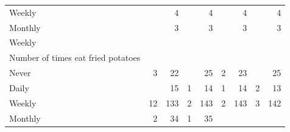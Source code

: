 \documentclass{article}
\begin{document}
\begin{table}[!h]
{\begin{tabular}{lllllllll}
			\multicolumn{1}{l}{\hspace{5em}Weekly} &
			\multicolumn{1}{|r}{} &
			\multicolumn{1}{r}{4} &
			\multicolumn{1}{r}{} &
			\multicolumn{1}{r}{4} &
			\multicolumn{1}{r}{} &
			\multicolumn{1}{r}{4} &
			\multicolumn{1}{r}{} &
			\multicolumn{1}{r}{4} \\
			\multicolumn{1}{l}{\hspace{5em}Monthly} &
			\multicolumn{1}{|r}{} &
			\multicolumn{1}{r}{3} &
			\multicolumn{1}{r}{} &
			\multicolumn{1}{r}{3} &
			\multicolumn{1}{r}{} &
			\multicolumn{1}{r}{3} &
			\multicolumn{1}{r}{} &
			\multicolumn{1}{r}{3} \\
			\multicolumn{1}{l}{\hspace{3em}Weekly} &
			\multicolumn{1}{|r}{} &
			\multicolumn{1}{r}{} &
			\multicolumn{1}{r}{} &
			\multicolumn{1}{r}{} &
			\multicolumn{1}{r}{} &
			\multicolumn{1}{r}{} &
			\multicolumn{1}{r}{} &
			\multicolumn{1}{r}{} \\
			\multicolumn{1}{l}{\hspace{4em}Number of times eat fried potatoes} &
			\multicolumn{1}{|r}{} &
			\multicolumn{1}{r}{} &
			\multicolumn{1}{r}{} &
			\multicolumn{1}{r}{} &
			\multicolumn{1}{r}{} &
			\multicolumn{1}{r}{} &
			\multicolumn{1}{r}{} &
			\multicolumn{1}{r}{} \\
			\multicolumn{1}{l}{\hspace{5em}Never} &
			\multicolumn{1}{|r}{3} &
			\multicolumn{1}{r}{22} &
			\multicolumn{1}{r}{} &
			\multicolumn{1}{r}{25} &
			\multicolumn{1}{r}{2} &
			\multicolumn{1}{r}{23} &
			\multicolumn{1}{r}{} &
			\multicolumn{1}{r}{25} \\
			\multicolumn{1}{l}{\hspace{5em}Daily} &
			\multicolumn{1}{|r}{} &
			\multicolumn{1}{r}{15} &
			\multicolumn{1}{r}{1} &
			\multicolumn{1}{r}{14} &
			\multicolumn{1}{r}{1} &
			\multicolumn{1}{r}{14} &
			\multicolumn{1}{r}{2} &
			\multicolumn{1}{r}{13} \\
			\multicolumn{1}{l}{\hspace{5em}Weekly} &
			\multicolumn{1}{|r}{12} &
			\multicolumn{1}{r}{133} &
			\multicolumn{1}{r}{2} &
			\multicolumn{1}{r}{143} &
			\multicolumn{1}{r}{2} &
			\multicolumn{1}{r}{143} &
			\multicolumn{1}{r}{3} &
			\multicolumn{1}{r}{142} \\
			\multicolumn{1}{l}{\hspace{5em}Monthly} &
			\multicolumn{1}{|r}{2} &
			\multicolumn{1}{r}{34} &
			\multicolumn{1}{r}{1} &
			\multicolumn{1}{r}{35} &

\end{tabular}}
\end{table}
\end{document}
